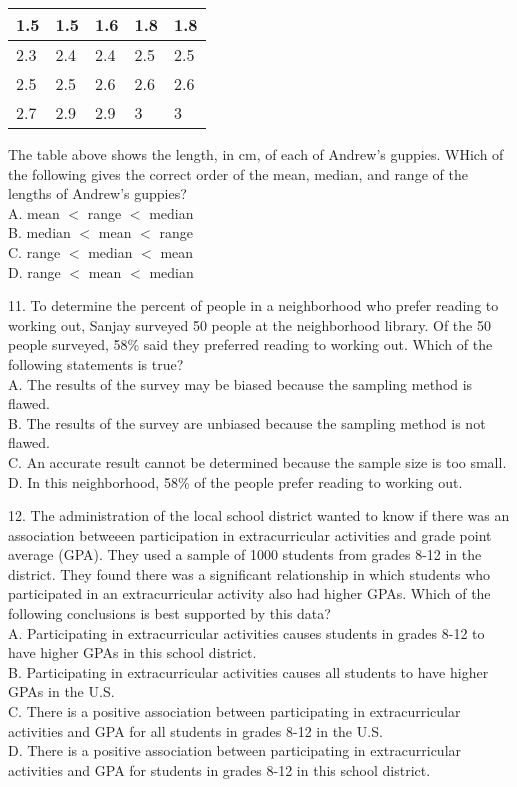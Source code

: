 \documentclass[../satmath.tex]{subfiles}
\begin{document}
\begin{table}[h]
    \centering
    \begin{tabular}{|l|l|l|l|l|}
    \hline
    1.5 & 1.5 & 1.6 & 1.8 & 1.8 \\ \hline
    2.3 & 2.4 & 2.4 & 2.5 & 2.5 \\ \hline
    2.5 & 2.5 & 2.6 & 2.6 & 2.6 \\ \hline
    2.7 & 2.9 & 2.9 & 3 & 3 \\ \hline
    \end{tabular}
\end{table}
The table above shows the length, in cm, of each of Andrew's guppies. WHich of the following gives the correct order of the mean, median, and range 
of the lengths of Andrew's guppies?\\
A. mean $<$ range $<$ median\\
B. median $<$ mean $<$ range\\
C. range $<$ median $<$ mean\\
D. range $<$ mean $<$ median 
\medbreak 

11. To determine the percent of people in a neighborhood who prefer reading to working out, Sanjay surveyed 50 people at the neighborhood library.
Of the 50 people surveyed, 58\% said they preferred reading to working out. Which of the following statements is true?\\
A. The results of the survey may be biased because the sampling method is flawed.\\
B. The results of the survey are unbiased because the sampling method is not flawed.\\
C. An accurate result cannot be determined because the sample size is too small.\\
D. In this neighborhood, 58\% of the people prefer reading to working out.
\medbreak 

12. The administration of the local school district wanted to know if there was an association betweeen participation in extracurricular activities and 
grade point average (GPA). They used a sample of 1000 students from grades 8-12 in the district. They found there was a significant relationship in which 
students who participated in an extracurricular activity also had higher GPAs. Which of the following conclusions is best supported by this data?\\
A. Participating in extracurricular activities causes students in grades 8-12 to have higher GPAs in this school district.\\
B. Participating in extracurricular activities causes all students to have higher GPAs in the U.S.\\
C. There is a positive association between participating in extracurricular activities and GPA for all students in grades 8-12 in the U.S.\\
D. There is a positive association between participating in extracurricular activities and GPA for students in grades 8-12 in this school district.
\medbreak 
\end{document}
